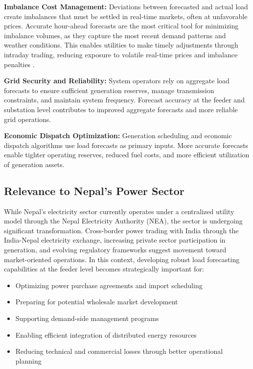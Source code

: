 \documentclass[oneside, 12pt]{book}
\numberwithin{equation}{chapter}
\newcommand{\sizexii}{\fontsize{12pt}{6pt}\selectfont}
\begin{document}
\textbf{Imbalance Cost Management:} Deviations between forecasted and actual load create imbalances that must be settled in real-time markets, often at unfavorable prices. Accurate hour-ahead forecasts are the most critical tool for minimizing imbalance volumes, as they capture the most recent demand patterns and weather conditions. This enables utilities to make timely adjustments through intraday trading, reducing exposure to volatile real-time prices and imbalance penalties \parencite{zareipour2010electricity}.

\textbf{Grid Security and Reliability:} System operators rely on aggregate load forecasts to ensure sufficient generation reserves, manage transmission constraints, and maintain system frequency. Forecast accuracy at the feeder and substation level contributes to improved aggregate forecasts and more reliable grid operations.

\textbf{Economic Dispatch Optimization:} Generation scheduling and economic dispatch algorithms use load forecasts as primary inputs. More accurate forecasts enable tighter operating reserves, reduced fuel costs, and more efficient utilization of generation assets.

\subsection{\sizexii Relevance to Nepal's Power Sector}

While Nepal's electricity sector currently operates under a centralized utility model through the Nepal Electricity Authority (NEA), the sector is undergoing significant transformation. Cross-border power trading with India through the India-Nepal electricity exchange, increasing private sector participation in generation, and evolving regulatory frameworks suggest movement toward market-oriented operations. In this context, developing robust load forecasting capabilities at the feeder level becomes strategically important for:

\begin{itemize}
    \item Optimizing power purchase agreements and import scheduling
    \item Preparing for potential wholesale market development
    \item Supporting demand-side management programs
    \item Enabling efficient integration of distributed energy resources
    \item Reducing technical and commercial losses through better operational planning
\end{itemize}
\end{document}
